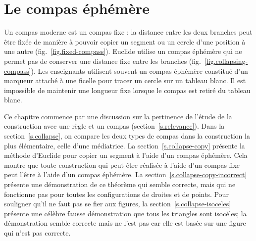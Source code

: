 

\chapter{Le compas éphémère}\label{c.collapse}



Un compas moderne est un compas fixe : la distance entre les deux branches peut être fixée de manière à pouvoir copier un segment  ou un cercle d'une position à une autre (fig.~\ref{fig.fixed-compass}). Euclide utilise un \og compas éphémère\fg{} qui ne permet pas de conserver  une distance fixe entre les branches  (fig.~\ref{fig.collapsing-compass}). Les enseignants utilisent souvent un compas éphémère constitué d'un marqueur attaché à une ficelle pour tracer un cercle sur un tableau blanc. Il est impossible de maintenir une longueur fixe lorsque le compas est retiré du tableau blanc. 

Ce chapitre commence par une discussion sur la pertinence de l'étude de la construction avec une règle et un compas (section~\ref{s.relevance}).
Dans la section~\ref{s.collapse}, on  compare les deux types de compas dans la construction la plus élémentaire, celle d'une médiatrice. La section~\ref{s.collapse-copy} présente la méthode d'Euclide pour copier un segment  à l'aide d'un compas éphémère. Cela montre que toute construction qui peut être réalisée à l'aide d'un compas fixe peut l'être à l'aide d'un compas éphémère. La section~\ref{s.collapse-copy-incorrect} présente  une démonstration de ce théorème qui semble correcte, mais qui ne fonctionne pas pour toutes les configurations de droites et de points. Pour souligner qu'il ne faut pas se fier aux figures, la section~\ref{s.collapse-isoceles} présente une célèbre fausse démonstration  que tous les triangles sont isocèles; la démonstration  semble correcte mais ne l'est pas car elle est basée sur une figure qui n'est pas correcte.


